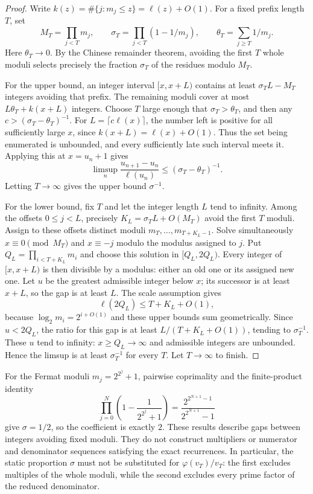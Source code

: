 \documentclass[11pt]{article}
\begin{document}
\begin{proof}
Write $k(z)=\#\{j:m_j\le z\}=\ell(z)+O(1)$. For a fixed prefix length
$T$, set
\[
 M_T=\prod_{j<T}m_j,\qquad
 \sigma_T=\prod_{j<T}(1-1/m_j),\qquad
 \theta_T=\sum_{j\ge T}1/m_j.
\]
Here $\theta_T\to0$. By the Chinese remainder theorem, avoiding the first
$T$ whole moduli selects precisely the fraction $\sigma_T$ of the
residues modulo $M_T$.

For the upper bound, an integer interval $[x,x+L)$ contains at least
$\sigma_TL-M_T$ integers avoiding that prefix. The remaining moduli
cover at most $L\theta_T+k(x+L)$ integers. Choose $T$ large enough that
$\sigma_T>\theta_T$, and then any
$c>(\sigma_T-\theta_T)^{-1}$.
For $L=\lceil c\ell(x)\rceil$, the number left is positive for all
sufficiently large $x$, since $k(x+L)=\ell(x)+O(1)$.
Thus the set being enumerated is unbounded, and every sufficiently late
such interval meets it. Applying this at $x=u_n+1$ gives
\[
 \limsup_n\frac{u_{n+1}-u_n}{\ell(u_n)}
 \le(\sigma_T-\theta_T)^{-1}.
\]
Letting $T\to\infty$ gives the upper bound $\sigma^{-1}$.

For the lower bound, fix $T$ and let the integer length $L$ tend to
infinity. Among the offsets $0\le j<L$, precisely
$K_L=\sigma_TL+O(M_T)$ avoid the first $T$ moduli.
Assign to these offsets distinct moduli
$m_T,\ldots,m_{T+K_L-1}$. Solve simultaneously
$x\equiv0\pmod{M_T}$ and $x\equiv-j$ modulo the modulus assigned to $j$.
Put $Q_L=\prod_{i<T+K_L}m_i$ and choose this solution in $[Q_L,2Q_L)$.
Every integer of $[x,x+L)$ is then divisible by a modulus: either an old
one or its assigned new one. Let $u$ be the greatest admissible integer
below $x$; its successor is at least $x+L$, so the gap is at least $L$.
The scale assumption gives
\[
 \ell(2Q_L)\le T+K_L+O(1),
\]
because $\log_2m_i=2^{i+O(1)}$ and these upper bounds sum geometrically.
Since $u<2Q_L$, the ratio for this gap is at least
$L/(T+K_L+O(1))$, tending to $\sigma_T^{-1}$.
These $u$ tend to infinity: $x\ge Q_L\to\infty$ and admissible integers
are unbounded. Hence the limsup is at least $\sigma_T^{-1}$ for every
$T$. Let $T\to\infty$ to finish.
\end{proof}

For the Fermat moduli $m_j=2^{2^j}+1$, pairwise coprimality and the
finite-product identity
\[
 \prod_{j=0}^{N}\left(1-\frac1{2^{2^j}+1}\right)
 =\frac{2^{2^{N+1}-1}}{2^{2^{N+1}}-1}
\]
give $\sigma=1/2$, so the coefficient is exactly $2$.
These results describe gaps between integers avoiding fixed moduli.
They do not construct multipliers or numerator and denominator sequences
satisfying the exact recurrences. In particular, the static proportion
$\sigma$ must not be substituted for $\varphi(v_T)/v_T$: the first
excludes multiples of the whole moduli, while the second excludes every
prime factor of the reduced denominator.
\end{document}
